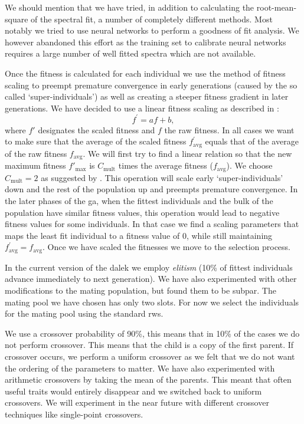 We should mention that we have tried, in addition to calculating the root-mean-square of the spectral fit, a number of completely different methods. Most notably we tried to use neural networks to perform a goodness of fit analysis. We however abandoned this effort as the training set to calibrate neural networks requires a large number of well fitted spectra which are not available. 

Once the fitness is calculated for each individual we use the method of fitness scaling to preempt premature convergence in early generations (caused by the so called `super-individuals') as well as creating a steeper fitness gradient in later generations. We have decided to use a linear fitness scaling as described in \citet[see page 76 of]{citeulike:125978}:
\[
f^\prime = af+b,
\]
where $f\prime$ designates the scaled fitness and $f$ the raw fitness.
In all cases we want to make sure that the average of the scaled fitness $f_\textrm{avg}^\prime$ equals that of the average of the raw fitness $f_\textrm{avg}$. We will first try to find a linear relation so that the new maximum fitness $f'_\textrm{max}$ is $C_\textrm{mult}$ times the average fitness ($f_\textrm{avg}$). We choose $C_\textrm{mult}=2$ as suggested by \citet{citeulike:125978}. This operation will scale early `super-individuals' down and the rest of the population up and preempts premature convergence. In the later phases of the \gls{ga}, when the fittest individuals and the bulk of the population have similar fitness values, this operation would lead to negative fitness values for some individuals. In that case we find a scaling parameters that maps the least fit individual to a fitness value of 0, while still maintaining $f_\textrm{avg}^\prime=f_\textrm{avg}$. Once we have scaled the fitnesses we move to the selection process.

In the current version of the \gls{dalek} we employ \textit{elitism} (10\% of fittest individuals advance immediately to next generation). We have also experimented with other modifications to the mating population, but found them to be subpar. The mating pool we have chosen has only two slots. For now we select the individuals for the mating pool using the standard \gls{rws}. 

We use a \gls{crossover} probability of 90\%, this means that in 10\% of the cases we do not perform \gls{crossover}. This means that the child is a copy of the first parent. If \gls{crossover} occurs, we perform a uniform crossover as we felt that we do not want the ordering of the parameters to matter. We have also experimented with arithmetic \glspl{crossover} by taking the mean of the parents. This meant that often useful traits would entirely disappear and we switched back to uniform \glspl{crossover}. We will experiment in the near future with different crossover techniques like single-point \glspl{crossover}. 

